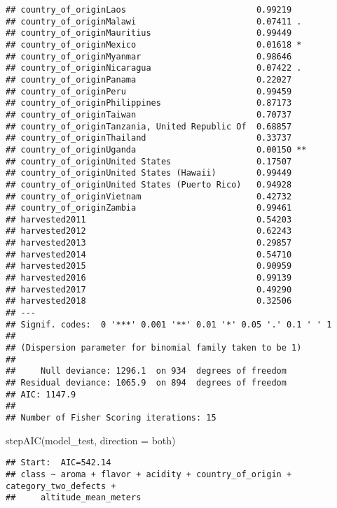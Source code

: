 \documentclass[
]{article}
\newenvironment{Shaded}{\begin{snugshade}}{\end{snugshade}}
\newcommand{\AttributeTok}[1]{\textcolor[rgb]{0.77,0.63,0.00}{#1}}
\newcommand{\FunctionTok}[1]{\textcolor[rgb]{0.00,0.00,0.00}{#1}}
\newcommand{\NormalTok}[1]{#1}
\newcommand{\StringTok}[1]{\textcolor[rgb]{0.31,0.60,0.02}{#1}}
\begin{document}
\begin{verbatim}
## country_of_originLaos                          0.99219    
## country_of_originMalawi                        0.07411 .  
## country_of_originMauritius                     0.99449    
## country_of_originMexico                        0.01618 *  
## country_of_originMyanmar                       0.98646    
## country_of_originNicaragua                     0.07422 .  
## country_of_originPanama                        0.22027    
## country_of_originPeru                          0.99459    
## country_of_originPhilippines                   0.87173    
## country_of_originTaiwan                        0.70737    
## country_of_originTanzania, United Republic Of  0.68857    
## country_of_originThailand                      0.33737    
## country_of_originUganda                        0.00150 ** 
## country_of_originUnited States                 0.17507    
## country_of_originUnited States (Hawaii)        0.99449    
## country_of_originUnited States (Puerto Rico)   0.94928    
## country_of_originVietnam                       0.42732    
## country_of_originZambia                        0.99461    
## harvested2011                                  0.54203    
## harvested2012                                  0.62243    
## harvested2013                                  0.29857    
## harvested2014                                  0.54710    
## harvested2015                                  0.90959    
## harvested2016                                  0.99139    
## harvested2017                                  0.49290    
## harvested2018                                  0.32506    
## ---
## Signif. codes:  0 '***' 0.001 '**' 0.01 '*' 0.05 '.' 0.1 ' ' 1
## 
## (Dispersion parameter for binomial family taken to be 1)
## 
##     Null deviance: 1296.1  on 934  degrees of freedom
## Residual deviance: 1065.9  on 894  degrees of freedom
## AIC: 1147.9
## 
## Number of Fisher Scoring iterations: 15
\end{verbatim}

\begin{Shaded}
\begin{Highlighting}[]
\FunctionTok{stepAIC}\NormalTok{(model\_test, }\AttributeTok{direction =} \StringTok{\textquotesingle{}both\textquotesingle{}}\NormalTok{)}
\end{Highlighting}
\end{Shaded}

\begin{verbatim}
## Start:  AIC=542.14
## class ~ aroma + flavor + acidity + country_of_origin + category_two_defects + 
##     altitude_mean_meters
\end{verbatim}
\end{document}
